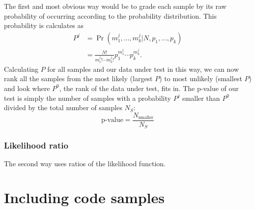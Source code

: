 \documentclass{ol-softwaremanual}
\begin{document}
The first and most obvious way would be to grade each sample by its raw 
probability of occurring according to the probability distribution. This 
probability is calculates as
\begin{align}
P^j &= \Pr\left(m^j_1, \ldots, m^j_k | N , p_1, \ldots, p_k\right)\\
&= \frac{N!}{m^j_1! \cdots m^j_k!} p_1^{m^j_1} \cdots p_k^{m^j_k}.
\end{align}
Calculating $P$ for all samples and our data under test in this way, we can 
now rank all the samples from the most likely (largest $P$) to most unlikely 
(smallest $P$) and look where $P^0$, the rank of the data under test, fits in. 
The p-value of our test is simply the number of samples with a probability 
$P^j$ smaller than $P^0$ divided by the total number of samples $N_S$:
\begin{equation}
\textrm{p-value} = \frac{N_{\textrm{smaller}}}{N_S}
\end{equation}


\subsubsection{Likelihood ratio}

The second way uses ratios of the likelihood function. 



\section{Including code samples}


\end{document}
